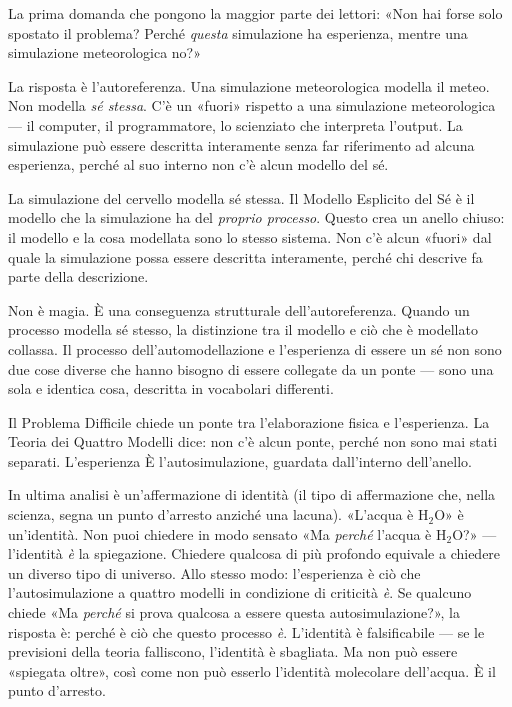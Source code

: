 \documentclass[11pt, twoside, openright]{book}
\begin{document}
La prima domanda che pongono la maggior parte dei lettori: «Non hai forse solo spostato il problema? Perché \textit{questa} simulazione ha esperienza, mentre una simulazione meteorologica no?»

La risposta è l'autoreferenza. Una simulazione meteorologica modella il meteo. Non modella \textit{sé stessa}. C'è un «fuori» rispetto a una simulazione meteorologica --- il computer, il programmatore, lo scienziato che interpreta l'output. La simulazione può essere descritta interamente senza far riferimento ad alcuna esperienza, perché al suo interno non c'è alcun modello del sé.

La simulazione del cervello modella sé stessa. Il Modello Esplicito del Sé è il modello che la simulazione ha del \textit{proprio processo}. Questo crea un anello chiuso: il modello e la cosa modellata sono lo stesso sistema. Non c'è alcun «fuori» dal quale la simulazione possa essere descritta interamente, perché chi descrive fa parte della descrizione.

Non è magia. È una conseguenza strutturale dell'autoreferenza. Quando un processo modella sé stesso, la distinzione tra il modello e ciò che è modellato collassa. Il processo dell'automodellazione e l'esperienza di essere un sé non sono due cose diverse che hanno bisogno di essere collegate da un ponte --- sono una sola e identica cosa, descritta in vocabolari differenti.

Il Problema Difficile chiede un ponte tra l'elaborazione fisica e l'esperienza. La Teoria dei Quattro Modelli dice: non c'è alcun ponte, perché non sono mai stati separati. L'esperienza È l'autosimulazione, guardata dall'interno dell'anello.

In ultima analisi è un'affermazione di identità (il tipo di affermazione che, nella scienza, segna un punto d'arresto anziché una lacuna). «L'acqua è H$_2$O» è un'identità. Non puoi chiedere in modo sensato «Ma \textit{perché} l'acqua è H$_2$O?» --- l'identità \textit{è} la spiegazione. Chiedere qualcosa di più profondo equivale a chiedere un diverso tipo di universo. Allo stesso modo: l'esperienza è ciò che l'autosimulazione a quattro modelli in condizione di criticità \textit{è}. Se qualcuno chiede «Ma \textit{perché} si prova qualcosa a essere questa autosimulazione?», la risposta è: perché è ciò che questo processo \textit{è}. L'identità è falsificabile --- se le previsioni della teoria falliscono, l'identità è sbagliata. Ma non può essere «spiegata oltre», così come non può esserlo l'identità molecolare dell'acqua. È il punto d'arresto.
\end{document}
